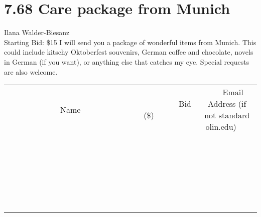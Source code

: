 \documentclass[11pt]{article}
\begin{document}
\section*{7.68 Care package from Munich}
Ilana Walder-Biesanz
\\
Starting Bid: \$15
\newline
I will send you a package of wonderful items from Munich. This could include kitschy Oktoberfest souvenirs, German coffee and chocolate, novels in German (if you want), or anything else that catches my eye. Special requests are also welcome.
\\[6ex]
\begin{tabular}{c c c}
~~~~~~~~~~~~~Name~~~~~~~~~~~~~ & ~~~~~~~~~Bid (\$)~~~~~~~~~  & ~~~Email Address (if not standard olin.edu)~~~\\
 & & \\
\hline
 & & \\
\hline
 & & \\
\hline
 & & \\
\hline
 & & \\
\hline
 & & \\
\hline
 & & \\
\hline
 & & \\
\hline
 & & \\
\hline
 & & \\
\hline
 & & \\
\hline
 & & \\
\hline
 & & \\
\hline
 & & \\
\hline
 & & \\
\hline
 & & \\
\hline
 & & \\
\hline
 & & \\
\hline
 & & \\
\hline
 & & \\
\hline
 & & \\
\hline
 & & \\
\hline
 & & \\
\hline
 & & \\
\hline
 & & \\
\hline
 & & \\
\hline
\end{tabular}
\newpage
\end{document}
